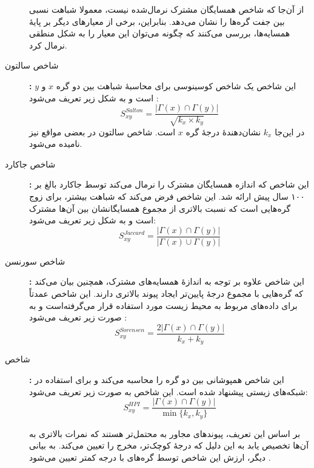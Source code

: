 \begin{description}
از آن‌جا که شاخص همسایگان مشترک نرمال‌شده نیست، معمولا شباهت نسبی بین جفت گره‌ها را نشان می‌دهد. بنابراین، برخی از معیارهای دیگر بر پایهٔ همسایه‌ها، بررسی می‌کنند که چگونه می‌توان این معیار را به شکل منطقی نرمال کرد.

\item[شاخص سالتون]\textbf{:}
این شاخص یک شاخص کوسینوسی برای محاسبهٔ شباهت بین دو گره $x$ و $y$ است و به شکل زیر تعریف می‌شود \cite{salton1986introduction}:
\begin{equation}
S^{Salton}_{xy}=\frac{|\Gamma(x)\cap\Gamma(y)|}{\sqrt{k_{x}\times k_{y}}}
\end{equation}
در این‌جا $k_{x}$ نشان‌دهندهٔ درجهٔ گره $x$ است. شاخص سالتون در بعضی مواقع \CosineSimilarity نیز نامیده می‌شود.

\item[شاخص جاکارد]\textbf{:}
این شاخص که اندازه همسایگان مشترک را نرمال می‌کند توسط جاکارد بالغ بر ۱۰۰ سال پیش ارائه شد. این شاخص فرض می‌کند که شباهت بیشتر، برای زوج گره‌هایی است که نسبت بالاتری از مجموع همسایگانشان بین آن‌ها مشترک است و به شکل زیر تعریف می‌شود:
\begin{equation}
S^{Jaccard}_{xy}=\frac{|\Gamma(x)\cap\Gamma(y)|}{|\Gamma(x)\cup\Gamma(y)|}
\end{equation}

\item[شاخص سورنسن]\textbf{:}
این شاخص علاوه بر توجه به اندازهٔ همسایه‌های مشترک، همچنین بیان می‌کند که گره‌هایی با مجموع درجهٔ پایین‌تر \Likelihood ایجاد پیوند بالاتری دارند. این شاخص عمدتاً برای داده‌های مربوط به محیط زیست مورد استفاده قرار می‌گرفته‌است و به صورت زیر تعریف می‌شود \cite{sorensen1948method}:
\begin{equation}
S_{xy}^{Sorensen}=\frac{2|\Gamma(x)\cap\Gamma(y)|}{k_{x}+k_{y}}
\end{equation}

\item[شاخص \lr{HP}]\textbf{:}
این شاخص همپوشانی \topological{} بین دو گره را محاسبه می‌کند و برای استفاده در شبکه‌های زیستی پیشنهاد شده است. این شاخص به صورت زیر تعریف می‌شود:
\begin{equation}
S_{xy}^{HPI}=\frac{|\Gamma(x)\cap\Gamma(y)|}{\min\{ k_{x},k_{y} \}}
\end{equation}

بر اساس این تعریف، پیوندهای مجاور به \Hubs محتمل‌تر هستند که نمرات بالاتری به آن‌ها تخصیص یابد به این دلیل که درجهٔ کوچک‌تر، مخرج را تعیین می‌کند. به بیانی دیگر، ارزش این شاخص توسط گره‌های با درجه کمتر تعیین می‌شود \cite{ravasz2002hierarchical}.


\end{description}
